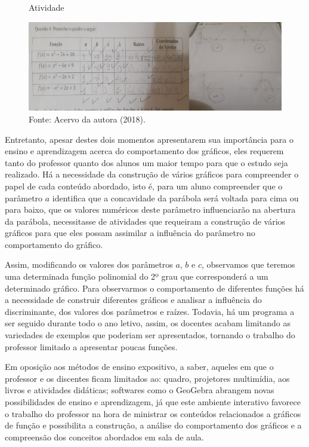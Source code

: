 \begin{refsection}
    \begin{figure}[ht]%
        \centering%
        \caption{Atividade}%
        \includegraphics[width=.80\textwidth]{articles/03-contribuicoes-do-sof/image11.jpeg}%
        \caption*{Fonte: Acervo da autora (2018).}%
        \label{fig:atividade-4}%
    \end{figure}%

    Entretanto, apesar destes dois momentos apresentarem sua importância para o ensino e aprendizagem acerca do comportamento dos gráficos, eles requerem tanto do professor quanto dos alunos um maior tempo para que o estudo seja realizado. Há a necessidade da construção de vários gráficos para compreender o papel de cada conteúdo abordado, isto é, para um aluno compreender que o parâmetro $a$ identifica que a concavidade da parábola será voltada para cima ou para baixo, que os valores numéricos deste parâmetro influenciarão na abertura da parábola, necessitasse de atividades que requeiram a construção de vários gráficos para que eles possam assimilar a influência do parâmetro no comportamento do gráfico. 

    Assim, modificando os valores dos parâmetros $a$, $b$ e $c$, observamos que teremos uma determinada função polinomial do 2º grau que corresponderá a um determinado gráfico. Para observarmos o comportamento de diferentes funções há a necessidade de construir diferentes gráficos e analisar a influência do discriminante, dos valores dos parâmetros e raízes. Todavia, há um programa a ser seguido durante todo o ano letivo, assim, os docentes acabam limitando as variedades de exemplos que poderiam ser apresentados, tornando o trabalho do professor limitado a apresentar poucas funções. 

    Em oposição aos métodos de ensino expositivo, a saber, aqueles em que o professor e os discentes ficam limitados ao: quadro, projetores multimídia, aos livros e atividades didáticas; softwares como o GeoGebra abrangem novas possibilidades de ensino e aprendizagem, já que este ambiente interativo favorece o trabalho do professor na hora de ministrar os conteúdos relacionados a gráficos de função e possibilita a construção, a análise do comportamento dos gráficos e a compreensão dos conceitos abordados em sala de aula. 


\end{refsection}
